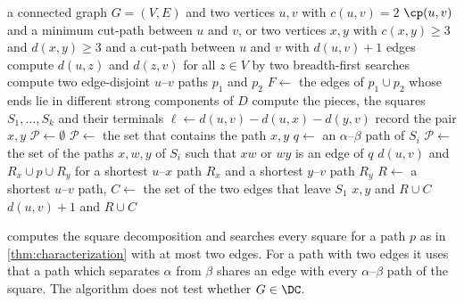 \begin{algorithm}[tb]
\caption{A minimum cut-path if $c(u, v) = 2$, or two vertices that show $G \notin \DC$}
\label{alg:cut-two}
\begin{algorithmic}[1]
\Require a connected graph $G = (V, E)$ and two vertices $u, v$ with $c(u, v) = 2$
\Ensure $\cp(u, v)$ and a minimum cut-path between $u$ and $v$, or two vertices $x, y$ with $c(x, y) \geq 3$ and $d(x, y) \geq 3$ and a cut-path between $u$ and $v$ with $d(u, v) + 1$ edges
\State compute $d(u, z)$ and $d(z, v)$ for all $z \in V$ by two breadth-first searches \label{line:bfs}
\State compute two edge-disjoint $u$--$v$ paths $p_1$ and $p_2$ \label{line:paths}
\State $F \gets$ the edges of $p_1 \cup p_2$ whose ends lie in different strong components of $D$ \label{line:residual}
\State compute the pieces, the squares $S_1, \dots, S_k$ and their terminals \label{line:pieces}
 \label{line:loop}
        \State $\ell \gets d(u, v) - d(u, x) - d(y, v)$ \label{line:length}
            \State record the pair $x, y$  \label{line:record}
        \EndIf
        \State $\mathcal{P} \gets \emptyset$
            \State $\mathcal{P} \gets$ the set that contains the path $x, y$ \label{line:edge}
            \State $q \gets$ an $\alpha$--$\beta$ path of $S_i$ \label{line:q}
            \State $\mathcal{P} \gets$ the set of the paths $x, w, y$ of $S_i$ such that $xw$ or $wy$ is an edge of $q$ \label{line:candidates}
        \EndIf
             \label{line:test}
                \State \Return $d(u, v)$ and $R_x \cup p \cup R_y$ for a shortest $u$--$x$ path $R_x$ and a shortest $y$--$v$ path $R_y$ \label{line:found}
            \EndIf
        \EndFor
    \EndFor
\EndFor
\State $R \gets$ a shortest $u$--$v$ path, $C \gets$ the set of the two edges that leave $S_1$ \label{line:union}
    \State \Return $x, y$ and $R \cup C$ \label{line:certificate}
\EndIf
\State \Return $d(u, v) + 1$ and $R \cup C$ \label{line:not-found}
\end{algorithmic}
\end{algorithm}

 computes the square decomposition and searches every square for a path $p$ as in \cref{thm:characterization} with at most two edges.
For a path with two edges it uses that a path which separates $\alpha$ from $\beta$ shares an edge with every $\alpha$--$\beta$ path of the square.
The algorithm does not test whether $G \in \DC$.

